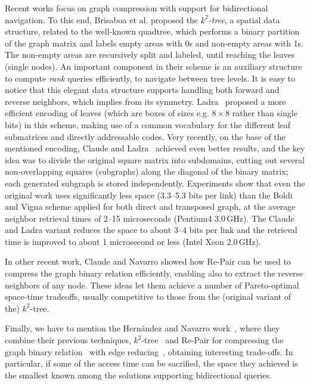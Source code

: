 \documentclass[envcountsame]{llncs}
\begin{document}
Recent works focus on graph compression with support for bidirectional navigation.
To this end, Brisaboa et al. \cite{BLNspire09.1} proposed the {\em $k^2$-tree}, 
a spatial data structure, 
related to the well-known quadtree, which performs a binary partition of the graph 
matrix and labels empty areas with 0s and non-empty areas with 1s. The non-empty 
areas are recursively split and labeled, until reaching the leaves (single nodes).
An important component in their scheme is an auxiliary structure to compute {\em rank}
queries \cite{Jac89} efficiently, to navigate between tree levels.
It is easy to notice that this elegant data structure supports handling both forward  
and reverse neighbors, which implies from its symmetry. 
Ladra~\cite{L11} proposed a more efficient encoding of leaves (which 
are boxes of sizes e.g. $8 \times 8$ rather than single bits)
in this scheme, making use of a common vocabulary for the different 
leaf submatrices and directly addressable codes.
Very recently, on the base of the mentioned encoding, Claude and Ladra~\cite{CL11} 
achieved even better results, and the key idea was to divide the original square matrix 
into subdomains, cutting out several non-overlapping squares (subgraphs) 
along the diagonal of the binary matrix; each generated subgraph is stored independently.
Experiments show that even the original work uses significantly less space 
(3.3--5.3 bits per link) than the Boldi and Vigna 
scheme applied for both direct and transposed graph, at the average neighbor retrieval 
times of 2--15 microseconds (Pentium4 3.0\,GHz).
The Claude and Ladra variant reduces the space to about 3--4 bits per link 
and the retrieval time is improved to about 1 microsecond or less (Intel Xeon 2.0\,GHz).

In other recent work, Claude and Navarro \cite{DBLP:conf/birthday/ClaudeN10} showed 
how Re-Pair can be used to compress the graph binary relation efficiently, enabling 
also to extract the reverse neighbors of any node. These ideas let them achieve 
a number of Pareto-optimal space-time tradeoffs, usually competitive to those from 
the (original variant of the) $k^2$-tree.

Finally, we have to mention the Hern{\'a}ndez and Navarro work~\cite{HNsnakdd11}, 
where they combine their previous techniques, $k^2$-tree~\cite{BLNspire09.1} 
and Re-Pair for compressing the graph binary relation~\cite{DBLP:conf/birthday/ClaudeN10} 
with edge reducing~\cite{DBLP:conf/wsdm/BuehrerC08}, obtaining interesting trade-offs.
In particular, if some of the access time can be sacrified, the space they achieved is 
the smallest known among the solutions supporting bidirectional queries.
\end{document}
